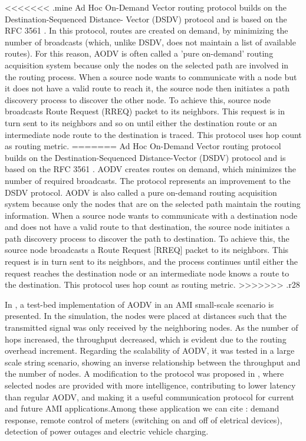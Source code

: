 \documentclass[11pt,draftclsnofoot,onecolumn]{IEEEtran}
\begin{document}
<<<<<<< .mine
Ad Hoc On-Demand Vector routing protocol builds on the Destination-Sequenced Distance- Vector (DSDV)  protocol and is based on the RFC 3561 \cite{Perkins2003} . In this protocol, routes are created on demand, by minimizing the number of broadcasts (which, unlike DSDV, does not maintain a list of available routes). For this reason, AODV is often called a 'pure on-demand' routing acquisition system because only the nodes on the selected path are involved in the routing process. When a source node wants to communicate with a node  but it does not have a valid route to reach it, the source node then initiates a path discovery process to discover the other node. To achieve this, source node broadcasts Route Request (RREQ) packet to its neighbors. This request is in turn sent to its neighbors and so on until either the destination route or an intermediate node route to the destination is traced. This protocol uses hop count as routing metric.
=======
Ad Hoc On-Demand Vector routing protocol builds on the Destination-Sequenced Distance-Vector (DSDV) protocol and is based on the RFC 3561 \cite{Perkins2003}. AODV creates routes on demand, which minimizes the number of required broadcasts. The protocol represents an improvement to the DSDV protocol. AODV is also called a pure on-demand routing acquisition system because only the nodes that are on the selected path maintain the routing information.  When a source node wants to communicate with a destination node and does not have a valid route to that destination, the source node initiates a path discovery process to discover the path to destination. To achieve this, the source node broadcasts a Route Request [RREQ] packet to its neighbors. This request is in turn sent to its neighbors, and the process continues until either the request reaches the destination node or an intermediate node knows a route to the destination. This protocol uses hop count as routing metric.
>>>>>>> .r28

In \cite{Toimoor2013}, a test-bed implementation of AODV in an AMI small-scale scenario is presented. In the simulation, the nodes were placed at distances such that the transmitted signal was only received by the neighboring nodes. As the number of hops increased, the throughput decreased, which is evident due to the routing overhead increment. Regarding the scalability of AODV, it was tested in a large scale string scenario, showing an inverse relationship between the throughput and the number of nodes. A modification to the protocol was proposed in \cite{Toimoor2013}, where selected nodes are provided with more intelligence, contributing to lower latency than regular AODV, and making it a useful communication protocol for current and future AMI applications.Among these application we can cite \cite{Toimoor2013}: demand response, remote control of meters (switching on and off of eletrical devices), detection of power outages and electric vehicle charging. 
\end{document}
